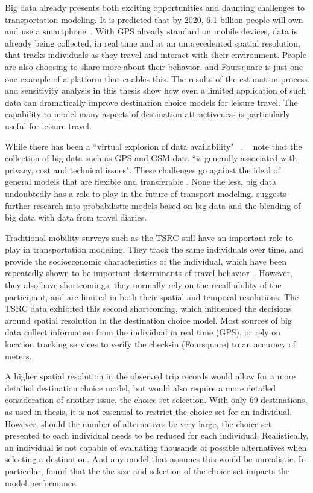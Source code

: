 Big data already presents both exciting opportunities and daunting challenges to transportation modeling. It is predicted that by 2020, 6.1 billion people will own and use a smartphone~\parencite{ericsson16}. With GPS already standard on mobile devices, data is already being collected, in real time and at an unprecedented spatial resolution, that tracks individuals as they travel and interact with their environment. People are also choosing to share more about their behavior, and Foursquare is just one one example of a platform that enables this. The results of the estimation process and sensitivity analysis in this thesis show how even a limited application of such data can dramatically improve destination choice models for leisure travel. The capability to model many aspects of destination attractiveness is particularly useful for leisure travel.

While there has been a ``virtual explosion of data availability" ~\textcite{nagel2001workshop},  ~\textcite{horni2012improve} note that  the collection of big data such as GPS and GSM data ``is generally associated with privacy, cost and technical issues".  These challenges go against the ideal of general models that are flexible and transferable \parencite{patriksson2015traffic}. None the less, big data undoubtedly has a role to play in the future of transport modeling. \textcite{rth2015} suggests further research into probabilistic models based on big data and the blending of big data with data from travel diaries. 

Traditional mobility surveys such as the TSRC still have an important role to play in transportation modeling. They track the same individuals over time, and provide the socioeconomic characteristics of the individual, which have been repeatedly shown to be important determinants of travel behavior~\parencite{pas1984effect,hanson1982determinants}. However, they also have shortcomings; they normally rely on the recall ability of the participant, and are limited in both their spatial and temporal resolutions. The TSRC data exhibited this second shortcoming, which influenced the decisions around spatial resolution in the destination choice model. Most sources of big data collect information from the individual in real time (GPS), or rely on location tracking services to verify the check-in (Foursquare) to an accuracy of meters.


A higher spatial resolution in the observed trip records would allow for a more detailed destination choice model, but would also require a more detailed consideration of another issue, the choice set selection. With only 69 destinations, as used in thesis, it is not essential to restrict the choice set for an individual. However, should the number of alternatives be very large, the choice set presented to each individual needs to be reduced for each individual. Realistically, an individual is not capable of evaluating thousands of possible alternatives when selecting a destination. And any model that assumes this would be unrealistic. In particular, \textcite{AkivaLerman85} found that the the size and selection of the choice set impacts the model performance.

